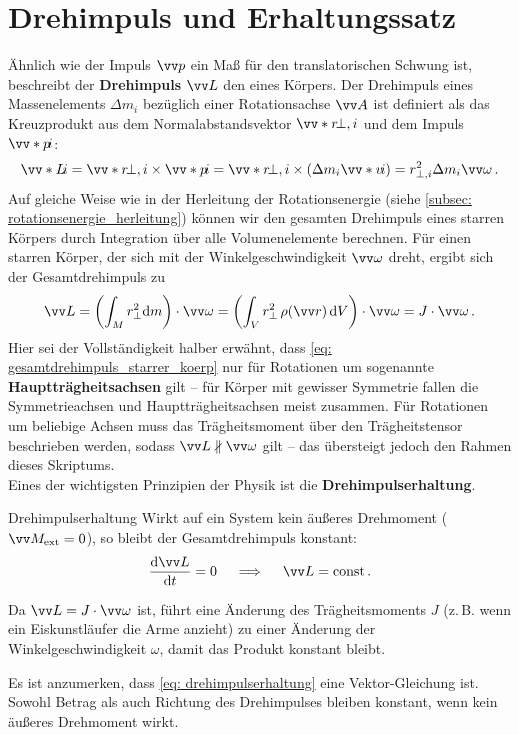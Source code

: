 \section{Drehimpuls und Erhaltungssatz}\label{sec: drehimpuls}
Ähnlich wie der Impuls $\ivec{p}$ ein Maß für den translatorischen Schwung ist, beschreibt der \textbf{Drehimpuls} $\ivec{L}$ den  eines Körpers. Der Drehimpuls eines Massenelements $\Delta m_i$ bezüglich einer Rotationsachse $\ivec{A}$ ist definiert als das Kreuzprodukt aus dem Normalabstandsvektor $\ivecS{r}{\perp, i}$ und dem Impuls $\ivecS{p}{i}$:
\begin{equation}\label{eq: drehimpuls}
    \ivecS{L}{i} = \ivecS{r}{\perp, i} \times \ivecS{p}{i} = \ivecS{r}{\perp, i} \times (\Delta m_i \ivecS{v}{i}) = r_{\perp,i}^2 \Delta m_i \ivec{\omega}\mDot
\end{equation}
Auf gleiche Weise wie in der Herleitung der Rotationsenergie (siehe \cref{subsec: rotationsenergie_herleitung}) können wir den gesamten Drehimpuls eines starren Körpers durch Integration über alle Volumenelemente berechnen. Für einen starren Körper, der sich mit der Winkelgeschwindigkeit $\ivec{\omega}$ dreht, ergibt sich der Gesamtdrehimpuls zu
\begin{equation}\label{eq: gesamtdrehimpuls_starrer_koerp}
    \ivec{L} = \left(\int_M r_{\perp}^2 \dd m \right) \cdot \ivec{\omega}  = \left(\int_V r_{\perp}^2 \, \rho(\ivec{r}) \, \dd V \right) \cdot \ivec{\omega} = J \cdot \ivec{\omega} \mDot
\end{equation}
Hier sei der Vollständigkeit halber erwähnt, dass \cref{eq: gesamtdrehimpuls_starrer_koerp} nur für Rotationen um sogenannte \textbf{Hauptträgheitsachsen} gilt -- für Körper mit gewisser Symmetrie fallen die Symmetrieachsen und Hauptträgheitsachsen meist zusammen. Für Rotationen um beliebige Achsen muss das Trägheitsmoment über den Trägheitstensor beschrieben werden, sodass $\ivec{L} \nparallel \ivec{\omega}$ gilt -- das übersteigt jedoch den Rahmen dieses Skriptums.\\

Eines der wichtigsten Prinzipien der Physik ist die \textbf{Drehimpulserhaltung}.
\begin{importantbox}{Drehimpulserhaltung}
    Wirkt auf ein System kein äußeres Drehmoment ($\ivec{M}_{\text{ext}} = 0$), so bleibt der Gesamtdrehimpuls konstant:
    \begin{equation}\label{eq: drehimpulserhaltung}
        \frac{\mathrm{d}\ivec{L}}{\mathrm{d}t} = 0 \quad \implies \quad \ivec{L} = \const \mDot
    \end{equation}
    
    Da $\ivec{L} = J \cdot \ivec{\omega}$ ist, führt eine Änderung des Trägheitsmoments $J$ (z.\,B. wenn ein Eiskunstläufer die Arme anzieht) zu einer Änderung der Winkelgeschwindigkeit $\omega$, damit das Produkt konstant bleibt.
\end{importantbox}
Es ist anzumerken, dass \cref{eq: drehimpulserhaltung} eine Vektor-Gleichung ist. Sowohl Betrag als auch Richtung des Drehimpulses bleiben konstant, wenn kein äußeres Drehmoment wirkt.